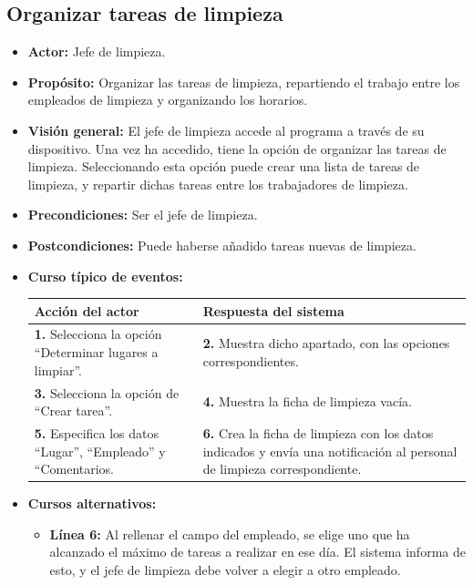 \documentclass[spanish,a4paper,11pt, twoside]{report}	%
\begin{document}
	\subsection{Organizar tareas de limpieza}
			\begin{itemize}
			\item \textbf{Actor: }Jefe de limpieza.
			\item \textbf{Propósito: }Organizar las tareas de limpieza, repartiendo el
				trabajo entre los empleados de limpieza y organizando los horarios.
			\item \textbf{Visión general: }El jefe de limpieza accede al programa a través
				de su dispositivo. Una vez ha accedido, tiene la opción de organizar las tareas de limpieza. 
				Seleccionando esta opción puede crear una lista de tareas de limpieza, y repartir dichas tareas
				entre los trabajadores de limpieza.
			\item \textbf{Precondiciones:} Ser el jefe de limpieza.
			\item \textbf{Postcondiciones:} Puede haberse añadido tareas nuevas de limpieza.
			\item \textbf{Curso típico de eventos:} \\
			\begin{tabular}{|p{6cm}||p{6cm}|}
				\hline
				\textbf{Acción del actor} & \textbf{Respuesta del sistema} \\ \hline \hline
				\textbf{1.} Selecciona la opción ``Determinar lugares a limpiar''. & 
				\textbf{2.} Muestra dicho apartado, con las opciones correspondientes. \\ \hline
				\textbf{3.} Selecciona la opción de ``Crear tarea''.	& 
				\textbf{4.} Muestra la ficha de limpieza vacía. \\ \hline
				\textbf{5.} Especifica los datos ``Lugar'', ``Empleado'' y ``Comentarios. & 
				\textbf{6.} Crea la ficha de limpieza con los datos indicados y 
					envía una notificación al personal de limpieza correspondiente. \\ \hline
			\end{tabular}

			\item \textbf{Cursos alternativos:} 
				\begin {itemize}
					
					\item \textbf{Línea 6: } Al rellenar el campo del empleado, se elige uno 
					que ha alcanzado el máximo de tareas a realizar en ese día. 
					El sistema informa de esto, y el jefe de limpieza debe volver a elegir a otro empleado.
				\end {itemize}
			\end{itemize}%
\end{document}
